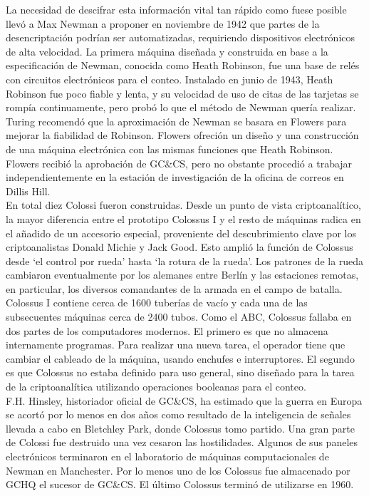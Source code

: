 \documentclass[a4paper]{article}
\begin{document}
    La necesidad de descifrar esta información vital tan rápido como fuese posible llevó a Max Newman a proponer en noviembre de 1942 que partes de la desencriptación podrían ser automatizadas, requiriendo dispositivos electrónicos de alta velocidad. La primera máquina diseñada y construida en base a la especificación de Newman, conocida como Heath Robinson, fue una base de relés con circuitos electrónicos para el conteo. Instalado en junio de 1943, Heath Robinson fue poco fiable y lenta, y su velocidad de uso de citas de las tarjetas se rompía continuamente, pero probó lo que el método de Newman  quería realizar. Turing recomendó que la aproximación de Newman  se basara en Flowers para mejorar la fiabilidad de Robinson. Flowers ofreción un diseño y una construcción de una máquina electrónica con las mismas funciones que Heath Robinson. Flowers recibió la aprobación de GC\&CS, pero no obstante procedió a trabajar independientemente en la estación  de investigación de la oficina de correos en Dillis Hill.\\

    En total diez Colossi fueron construidas. Desde un punto de vista criptoanalítico, la mayor diferencia entre el prototipo Colossus I y el resto de máquinas radica en el añadido de un accesorio especial, proveniente del descubrimiento clave por los criptoanalistas Donald Michie y Jack Good. Esto amplió la función de Colossus desde ‘el control por rueda’ hasta ‘la rotura de la rueda’. Los patrones de la rueda cambiaron eventualmente por los alemanes entre Berlín y las estaciones remotas, en particular, los diversos comandantes de la armada en el campo de batalla.\\

    Colossus I contiene cerca de 1600 tuberías de vacío y cada una de las subsecuentes máquinas cerca de 2400 tubos. Como el ABC, Colossus fallaba en dos partes de los computadores modernos. El primero es que no almacena internamente programas. Para realizar una nueva tarea, el operador tiene que cambiar el cableado de la máquina, usando enchufes e interruptores. El segundo es que Colossus no estaba definido para uso general, sino diseñado para la tarea de la criptoanalítica utilizando operaciones booleanas para el conteo.\\

    F.H. Hinsley, historiador oficial de GC\&CS, ha estimado que la guerra en Europa se acortó por lo menos en dos años como resultado de la inteligencia de señales llevada a cabo en Bletchley Park, donde Colossus tomo partido. Una gran parte de Colossi fue destruido una vez cesaron las hostilidades. Algunos de sus paneles electrónicos terminaron en el laboratorio de máquinas computacionales de Newman en Manchester. Por lo menos uno de los Colossus fue almacenado por GCHQ el sucesor de GC\&CS. El último Colossus terminó de utilizarse en 1960.\\
\end{document}

